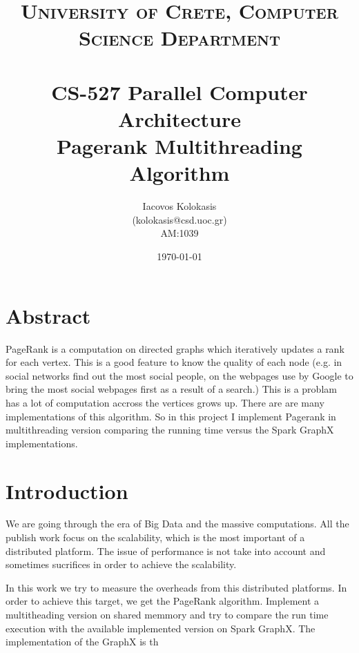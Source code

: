 \documentclass[paper=a4, fontsize=11pt]{scrartcl} %
\title{	
\normalfont \normalsize 
\textsc{University of Crete, Computer Science Department} \\ [25pt] %
\horrule{0.5pt} \\[0.4cm] %
\huge CS-527 Parallel Computer Architecture \\ 
Pagerank Multithreading Algorithm %
\horrule{2pt} \\[0.5cm] %
}
\author{Iacovos Kolokasis \\(kolokasis@csd.uoc.gr) \\AM:1039} %
\date{\normalsize\today} %
\numberwithin{equation}{section} %
\numberwithin{figure}{section} %
\numberwithin{table}{section} %
\begin{document}
\maketitle %


\section{Abstract}

PageRank is a computation on directed graphs which iteratively updates a rank
for each vertex. This is a good feature to know the quality of each node (e.g.
in social networks find out the most social people, on the webpages use by
Google to bring the most social webpages first as a result of a search.) This is
a problam has a lot of computation accross the vertices grows up. There are are
many implementations of this algorithm. So in this project I implement Pagerank
in multithreading version comparing the running time versus the Spark GraphX
implementations. %



\section{Introduction}

We are going through the era of Big Data and the massive computations. All the
publish work focus on the scalability, which is the most important of a
distributed platform. The issue of performance is not take into account and
sometimes sucrifices in order to achieve the scalability.

In this work we try to measure the overheads from this distributed platforms.
In order to achieve this target, we get the PageRank algorithm. Implement a
multitheading version on shared memmory and try to compare the run time
execution with the available implemented version on Spark GraphX. The
implementation of the GraphX is th


\end{document}
